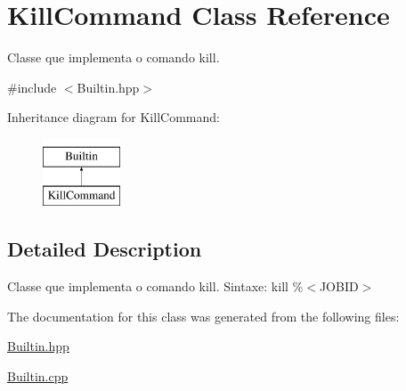 \hypertarget{classKillCommand}{
\section{KillCommand Class Reference}
\label{classKillCommand}
}


Classe que implementa o comando kill.  




{\ttfamily \#include $<$Builtin.hpp$>$}

Inheritance diagram for KillCommand:\begin{figure}[H]
\begin{center}
\leavevmode
\includegraphics[height=2.000000cm]{classKillCommand}
\end{center}
\end{figure}


\subsection{Detailed Description}
Classe que implementa o comando kill. Sintaxe: kill \%$<$JOBID$>$ 

The documentation for this class was generated from the following files:\begin{DoxyCompactItemize}
\item 
\hyperlink{Builtin_8hpp}{Builtin.hpp}\item 
\hyperlink{Builtin_8cpp}{Builtin.cpp}\end{DoxyCompactItemize}

